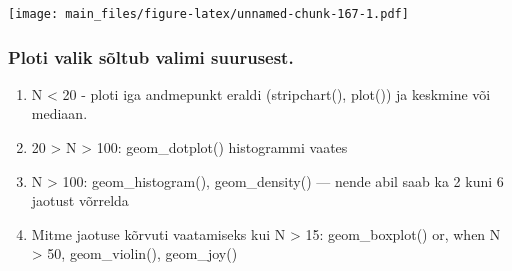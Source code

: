 \documentclass[]{book}
\newenvironment{Shaded}{\begin{snugshade}}{\end{snugshade}}
\newcommand{\KeywordTok}[1]{\textcolor[rgb]{0.13,0.29,0.53}{\textbf{#1}}}
\newcommand{\DataTypeTok}[1]{\textcolor[rgb]{0.13,0.29,0.53}{#1}}
\newcommand{\DecValTok}[1]{\textcolor[rgb]{0.00,0.00,0.81}{#1}}
\newcommand{\StringTok}[1]{\textcolor[rgb]{0.31,0.60,0.02}{#1}}
\newcommand{\OperatorTok}[1]{\textcolor[rgb]{0.81,0.36,0.00}{\textbf{#1}}}
\newcommand{\NormalTok}[1]{#1}
\begin{document}
\begin{Shaded}
\end{Shaded}

\texttt{[image: main\_files/figure-latex/unnamed-chunk-167-1.pdf]}

\subsubsection{Ploti valik sõltub valimi
suurusest.}\label{ploti-valik-soltub-valimi-suurusest.}

\begin{enumerate}
\def\labelenumi{\arabic{enumi})}
\item
  N \textless{} 20 - ploti iga andmepunkt eraldi (stripchart(), plot())
  ja keskmine või mediaan.
\item
  20 \textgreater{} N \textgreater{} 100: geom\_dotplot() histogrammi
  vaates
\item
  N \textgreater{} 100: geom\_histogram(), geom\_density() --- nende
  abil saab ka 2 kuni 6 jaotust võrrelda
\item
  Mitme jaotuse kõrvuti vaatamiseks kui N \textgreater{} 15:
  geom\_boxplot() or, when N \textgreater{} 50, geom\_violin(),
  geom\_joy()
\end{enumerate}
\end{document}
